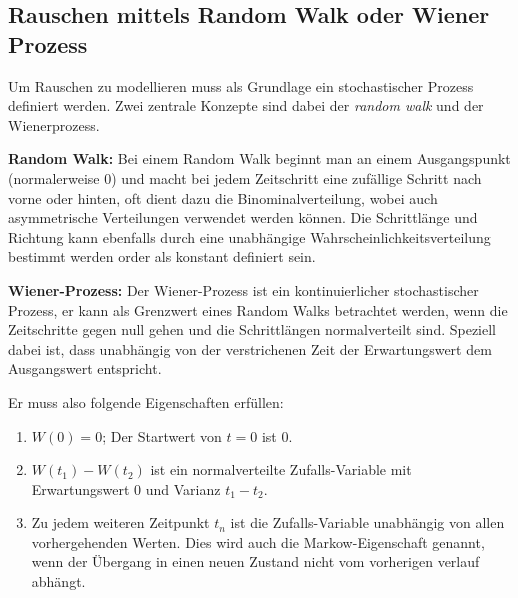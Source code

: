 \subsection{Rauschen mittels Random Walk oder Wiener Prozess\label{brown:Rauschen:RandomWalkWiener}}

Um Rauschen zu modellieren muss als Grundlage ein stochastischer Prozess definiert werden. Zwei zentrale Konzepte sind dabei der \textit{random walk} und der Wienerprozess.

\begin{definition}\textbf{Random Walk:}
	\label{randomWalk}
	Bei einem Random Walk beginnt man an einem Ausgangspunkt (normalerweise 0) und macht bei jedem Zeitschritt eine zufällige Schritt nach vorne oder hinten, oft dient dazu die Binominalverteilung, wobei auch asymmetrische Verteilungen verwendet werden können. Die Schrittlänge und Richtung kann ebenfalls durch eine unabhängige Wahrscheinlichkeitsverteilung bestimmt werden order als konstant definiert sein.
\end{definition}

\begin{definition}\textbf{Wiener-Prozess:}
	\label{wienerprozess}
	Der Wiener-Prozess ist ein kontinuierlicher stochastischer Prozess, er kann als Grenzwert eines Random Walks betrachtet werden, wenn die Zeitschritte gegen null gehen und die Schrittlängen normalverteilt sind. Speziell dabei ist, dass unabhängig von der verstrichenen Zeit der Erwartungswert dem Ausgangswert entspricht.	
\end{definition}

Er muss also folgende Eigenschaften erfüllen: 



\begin{enumerate}
	\item $ W(0) = 0 $; Der Startwert von $ t = 0 $ ist 0.
	\item $ W(t_{1}) - W(t_{2}) $ ist ein normalverteilte Zufalls-Variable mit Erwartungswert 0 und Varianz $ t_{1} - t_{2} $.
	\item Zu jedem weiteren Zeitpunkt $ t_{n} $ ist die Zufalls-Variable unabhängig von allen vorhergehenden Werten. Dies wird auch die Markow-Eigenschaft genannt, wenn der Übergang in einen neuen Zustand nicht vom vorherigen verlauf abhängt.
\end{enumerate}


